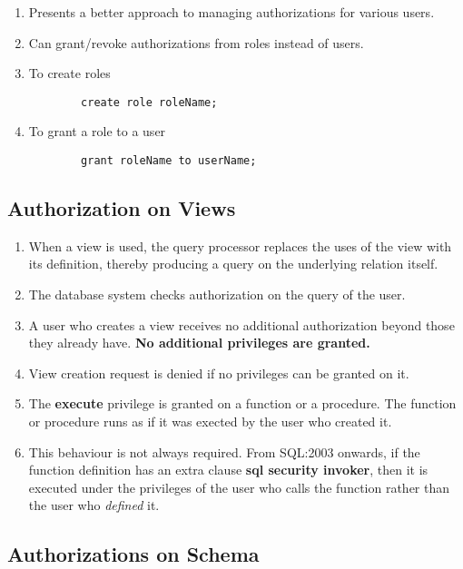 \documentclass[journal,12pt,twocolumn]{IEEEtran}
\begin{document}
\begin{enumerate}
    \item Presents a better approach to managing authorizations for various 
    users.
    \item Can grant/revoke authorizations from roles instead of users.
    \item To create roles 
    \begin{lstlisting}
        create role roleName;
    \end{lstlisting}
    \item To grant a role to a user
    \begin{lstlisting}
        grant roleName to userName;
    \end{lstlisting}
\end{enumerate}

\subsection{Authorization on Views}

\begin{enumerate}
    \item When a view is used, the query processor replaces the uses of the view
    with its definition, thereby producing a query on the underlying relation
    itself.
    \item The database system checks authorization on the query of the user.
    \item A user who creates a view receives no additional authorization beyond
    those they already have. \textbf{No additional privileges are granted.}
    \item View creation request is denied if no privileges can be granted on it.
    \item The \textbf{execute} privilege is granted on a function or a procedure.
    The function or procedure runs as if it was exected by the user who created 
    it.
    \item This behaviour is not always required. From SQL:2003 onwards, if the 
    function definition has an extra clause \textbf{sql security invoker}, then 
    it is executed under the privileges of the user who calls the function rather
    than the user who \textit{defined} it.
\end{enumerate}

\subsection{Authorizations on Schema}
\end{document}
